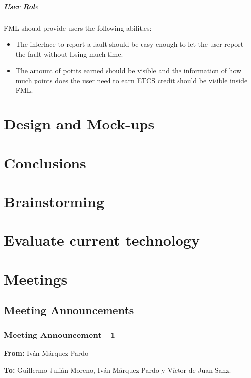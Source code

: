 \documentclass{report}
\begin{document}
\paragraph{User Role}
FML should provide users the following abilities:
\begin{itemize}
\item The interface to report a fault should be easy enough to let the user report the fault without losing much time.
\item The amount of points earned should be visible and the information of how much points does the user need to earn ETCS credit should be visible inside FML.
\end{itemize}


\chapter{Design and Mock-ups}



\chapter{Conclusions}


\appendix

\chapter{Brainstorming}




\chapter{Evaluate current technology}

\chapter{Meetings}


\section{Meeting Announcements}
\subsection{Meeting Announcement - 1}

\textbf{From: } Iván Márquez Pardo

\textbf{To: } Guillermo Julián Moreno, Iván Márquez Pardo y Víctor de Juan Sanz.
\end{document}
